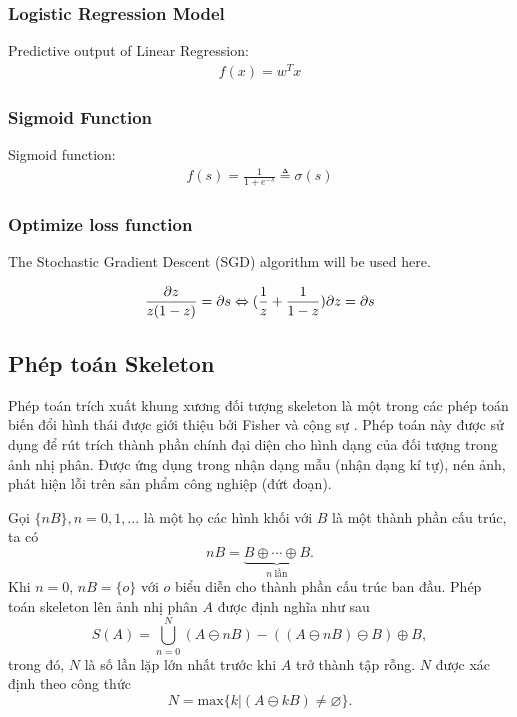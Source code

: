 \subsubsection{Logistic Regression Model}
Predictive output of Linear Regression:
\begin{align}
	f(x) = w^T x
\end{align}

\subsubsection{Sigmoid Function}
Sigmoid function:
\begin{align}
    f(s) = \frac{1}{1 + e^{-s}} \triangleq \sigma(s)
\end{align}

\subsubsection{Optimize loss function}
The Stochastic Gradient Descent (SGD) algorithm will be used here.

\begin{align}
    \frac{\partial z}{z(1-z)} = \partial s \newline
	\Leftrightarrow (\frac{1}{z} + \frac{1}{1 - z})\partial z = \partial s \newline
\end{align}

\subsection{Phép toán Skeleton}
\label{subsec:phep_toan_skeleton}
	Phép toán trích xuất khung xương đối tượng skeleton là một trong các phép toán biến đổi hình thái được giới thiệu bởi Fisher và cộng sự \cite{hipr2thining}. Phép toán này được sử dụng để rút trích thành phần chính đại diện cho hình dạng của đối tượng trong ảnh nhị phân. Được ứng dụng trong nhận dạng mẫu (nhận dạng kí tự), nén ảnh, phát hiện lỗi trên sản phẩm công nghiệp (đứt đoạn).
	
	Gọi $\{nB\}, n= 0, 1, ...$ là một họ các hình khối với $B$ là một thành phần cấu trúc, ta có
	\begin{equation}
		nB = \underbrace{B\oplus \cdots \oplus B}_{n\ \text{lần}}.
		\label{eqn:skeleton_nb}
	\end{equation}
	Khi $n=0$, $nB=\{o\}$ với $o$ biểu diễn cho thành phần cấu trúc ban đầu. Phép toán skeleton lên ảnh nhị phân $A$ được định nghĩa như sau
	\begin{equation}
		S(A) = \bigcup_{n = 0}^N (A \ominus nB) - ((A \ominus nB) \ominus B)\oplus B,
		\label{eqn:skeleton}
	\end{equation}
	trong đó, $N$ là số lần lặp lớn nhất trước khi $A$ trở thành tập rỗng. $N$ được xác định theo công thức
	\begin{equation}
		N = \text{max}\{k|(A\ominus kB)\neq\varnothing\}.
	\label{eqn:skeleton_n}
	\end{equation}
	

